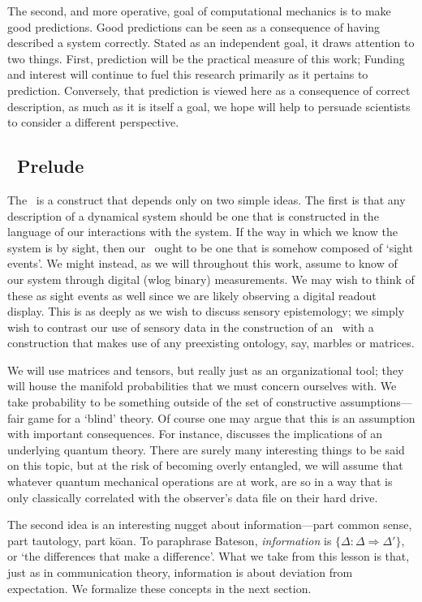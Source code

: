The second, and more operative, goal of computational mechanics is to make good predictions. Good predictions can be seen as a consequence of having described a system correctly. Stated as an independent goal, it draws attention to two things. First, prediction will be the practical measure of this work; Funding and interest will continue to fuel this research primarily as it pertains to prediction. Conversely, that prediction is viewed here as a consequence of correct description, as much as it is itself a goal, we hope will help to persuade scientists to consider a different perspective.

\subsection{\eM\ Prelude}
The \eM\ is a construct that depends only on two simple ideas. The first is that any description of a dynamical system should be one that is constructed in the language of our interactions with the system. If the way in which we know the system is by sight, then our \eM\ ought to be one that is somehow composed of `sight events'. We might instead, as we will throughout this work, assume to know of our system through digital (wlog binary) measurements. We may wish to think of these as sight events as well since we are likely observing a digital readout display. This is as deeply as we wish to discuss sensory epistemology; we simply wish to contrast our use of sensory data in the construction of an \eM\ with a construction that makes use of any preexisting ontology, say, marbles or matrices.

We will use matrices and tensors, but really just as an organizational tool; they will house the manifold probabilities that we must concern ourselves with. We take probability to be something outside of the set of constructive assumptions---fair game for a `blind' theory. Of course one may argue that this is an assumption with important consequences. For instance,  discusses the implications of an underlying quantum theory. There are surely many interesting things to be said on this topic, but at the risk of becoming overly entangled, we will assume that whatever quantum mechanical operations are at work, are so in a way that is only classically correlated with the observer's data file on their hard drive.

The second idea is an interesting nugget about information---part common sense, part tautology, part k\=oan. To paraphrase Bateson, \emph{information} is $\{\Delta : \Delta \Rightarrow \Delta'\}$, or `the differences that make a difference'. What we take from this lesson is that, just as in communication theory, information is about deviation from expectation.  We formalize these concepts in the next section.

